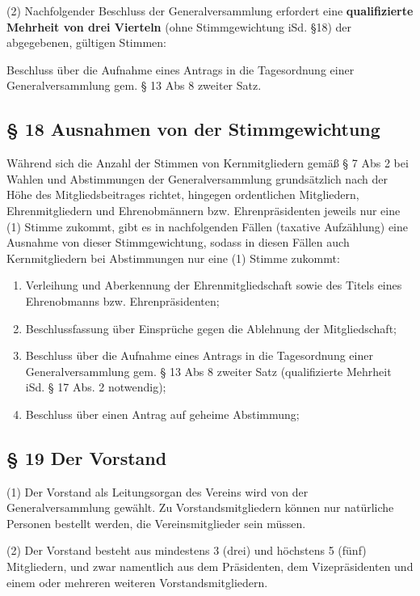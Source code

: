 \documentclass[11pt,a4paper]{article}
\begin{document}
(2)
Nachfolgender Beschluss der Generalversammlung erfordert eine \textbf{qualifizierte Mehrheit von drei Vierteln} (ohne Stimmgewichtung iSd. §18) der abgegebenen, gültigen Stimmen:

Beschluss über die Aufnahme eines Antrags in die Tagesordnung einer Generalversammlung gem. § 13 Abs 8 zweiter Satz.

\subsection{§ 18
Ausnahmen von der Stimmgewichtung}

Während sich die Anzahl der Stimmen von Kernmitgliedern gemäß § 7 Abs 2 bei Wahlen und Abstimmungen der Generalversammlung grundsätzlich nach der Höhe des Mitgliedsbeitrages richtet, hingegen ordentlichen Mitgliedern, Ehrenmitgliedern und Ehrenobmännern bzw. Ehrenpräsidenten jeweils nur eine (1) Stimme zukommt, gibt es in nachfolgenden Fällen (taxative Aufzählung) eine Ausnahme von dieser Stimmgewichtung, sodass in diesen Fällen auch Kernmitgliedern bei Abstimmungen nur eine (1) Stimme zukommt:

\begin{enumerate}[label=\alph*)]
\item
Verleihung und Aberkennung der Ehrenmitgliedschaft sowie des Titels eines Ehrenobmanns bzw. Ehrenpräsidenten;
\item
Beschlussfassung über Einsprüche gegen die Ablehnung der Mitgliedschaft;
\item
Beschluss über die Aufnahme eines Antrags in die Tagesordnung einer Generalversammlung gem. § 13 Abs 8 zweiter Satz (qualifizierte Mehrheit iSd. § 17 Abs. 2 notwendig);
\item
Beschluss über einen Antrag auf geheime Abstimmung;
\end{enumerate}

\subsection{§ 19
Der Vorstand}

(1)
Der Vorstand als Leitungsorgan des Vereins wird von der Generalversammlung gewählt.
Zu Vorstandsmitgliedern können nur natürliche Personen bestellt werden, die Vereinsmitglieder sein müssen.

(2)
Der Vorstand besteht aus mindestens 3 (drei) und höchstens 5 (fünf) Mitgliedern, und zwar namentlich aus dem Präsidenten, dem Vizepräsidenten und einem oder mehreren weiteren Vorstandsmitgliedern.
\end{document}
